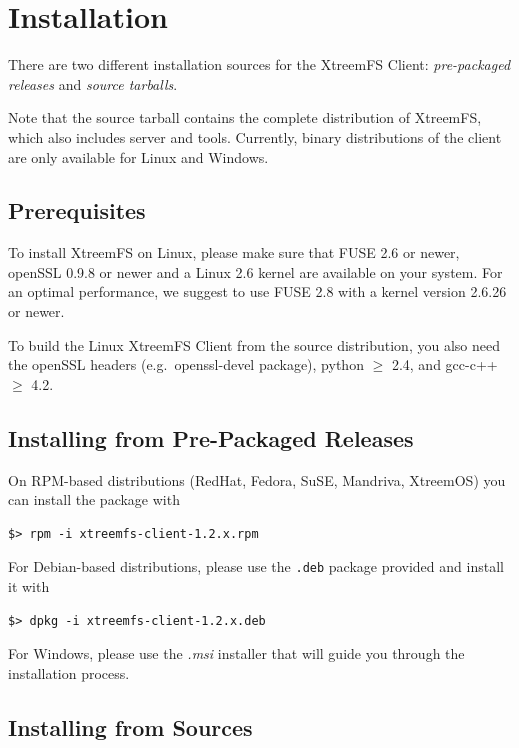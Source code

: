 \documentclass[a4paper,10pt]{book}
\begin{document}
\section{Installation}

There are two different installation sources for the XtreemFS Client: \emph{pre-packaged releases} and \emph{source tarballs}.

Note that the source tarball contains the complete distribution of XtreemFS, which also includes server and tools. Currently, binary distributions of the client are only available for Linux and Windows.

\subsection{Prerequisites}

To install XtreemFS on Linux, please make sure that FUSE 2.6 or newer, openSSL 0.9.8 or newer and a Linux 2.6 kernel are available on your system. For an optimal performance, we suggest to use FUSE 2.8 with a kernel version 2.6.26 or newer.

To build the Linux XtreemFS Client from the source distribution, you also need the openSSL headers (e.g.\ openssl-devel package), python $\geq$ 2.4, and gcc-c++ $\geq$ 4.2.

\subsection{Installing from Pre-Packaged Releases}

On RPM-based distributions (RedHat, Fedora, SuSE, Mandriva, XtreemOS) you can install the package with

\begin{verbatim}
$> rpm -i xtreemfs-client-1.2.x.rpm
\end{verbatim}


For Debian-based distributions, please use the \texttt{.deb} package provided and install it with

\begin{verbatim}
$> dpkg -i xtreemfs-client-1.2.x.deb
\end{verbatim}


For Windows, please use the \emph{.msi} installer that will guide you through the installation process.

\subsection{Installing from Sources}
\end{document}
